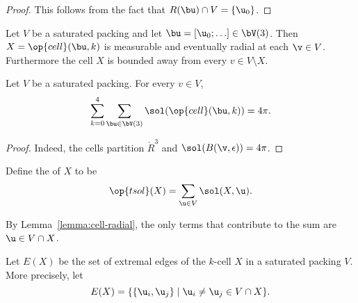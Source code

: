 \begin{proof} This follows from the fact that 
$R(\bu)\cap V = \{\u_0\}$.
\end{proof}

\begin{lemma}\label{lemma:cell-radial}
Let $V$ be a saturated packing and let $\bu=[\u_0;\ldots]\in \bV(3)$.
Then  $X=\op{cell}(\bu,k)$ is measurable and eventually radial at each $\v\in V$.
Furthermore the cell $X$ is bounded away from every $v\in V\setminus X$.
\end{lemma}

\begin{lemma}
Let $V$ be a saturated packing.  For every $v\in V$,
\[
\sum_{k=0}^4 \sum_{\bu\in \bV(3)}  \sol(\op{cell}(\bu,k)) = 4\pi.
\]
\end{lemma}

\begin{proof}  Indeed, the cells partition $\ring{R}^3$ and $\sol(B(\v,\epsilon)) = 4\pi$.
\end{proof}

\begin{definition}[$\op{tsol}$] 
  Define
  the  of $X$ to be
\begin{displaymath} 
\op{tsol}(X) = \sum_{ \u\in V} \sol(X, \u).
\end{displaymath}
\end{definition}
%
%
%

By Lemma~\ref{lemma:cell-radial}, the only terms that contribute to the sum are $\u\in V\cap X$.

\begin{definition}[edge]
Let $E(X)$ be the set of extremal edges of the $k$-cell $X$ in 
a saturated packing $V$.
More precisely, let
\begin{displaymath}E(X)=\{\{ \u_i, \u_j\}\mid \u_i\ne \u_j\in
V\cap X\}.\end{displaymath}
%
\end{definition}

